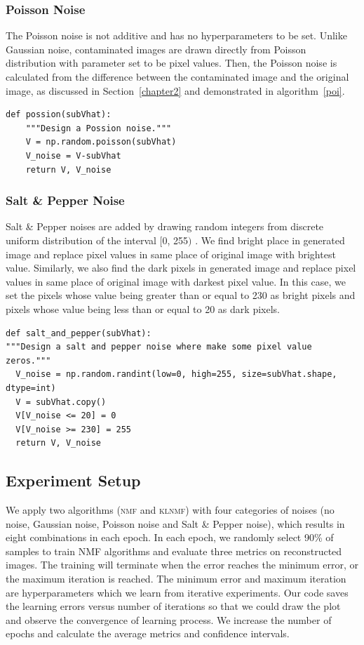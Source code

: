 \subsubsection{Poisson Noise}\label{sec:poi}
The Poisson noise is not additive and has no hyperparameters to be set. Unlike Gaussian noise, contaminated images are drawn directly from Poisson distribution with parameter set to be pixel values. Then, the Poisson noise is calculated from the difference between the contaminated image and the original image, as discussed in Section~\ref{chapter2} and demonstrated in algorithm~\ref{poi}.
\begin{lstlisting}[caption= Poisson Noise Design, label=poi]
def possion(subVhat):
    """Design a Possion noise."""
    V = np.random.poisson(subVhat)
    V_noise = V-subVhat
    return V, V_noise
\end{lstlisting}


\subsubsection{Salt \& Pepper Noise}\label{sec:sal}
Salt \& Pepper noises are added by drawing random integers from discrete uniform distribution of the interval $[$0, 255$)$ . We find bright place in generated image and replace pixel values in same place of original image with brightest value. Similarly, we also find the dark pixels in generated image and replace pixel values in same place of original image with darkest pixel value. In this case, we set the pixels whose value being greater than or equal to 230 as bright pixels and pixels whose value being less than or equal to 20 as dark pixels.
\begin{lstlisting}[caption= Salt and Pepper Noise Design, label=salt]
def salt_and_pepper(subVhat):
"""Design a salt and pepper noise where make some pixel value zeros."""
  V_noise = np.random.randint(low=0, high=255, size=subVhat.shape, dtype=int)
  V = subVhat.copy()
  V[V_noise <= 20] = 0
  V[V_noise >= 230] = 255
  return V, V_noise
\end{lstlisting}

\subsection{Experiment Setup}

We apply two algorithms (\textsc{nmf} and \textsc{klnmf}) with four categories of noises (no noise, Gaussian noise, Poisson noise and Salt \& Pepper noise), which results in eight combinations in each epoch. In each epoch, we randomly select 90\% of samples to train NMF algorithms and evaluate three metrics on reconstructed images. The training will terminate when the error reaches the minimum error, or the maximum iteration is reached. The minimum error and maximum iteration are hyperparameters which we learn from iterative experiments. Our code saves the learning errors versus number of iterations so that we could draw the plot and observe the convergence of learning process. We increase the number of epochs and calculate the average metrics and confidence intervals.


